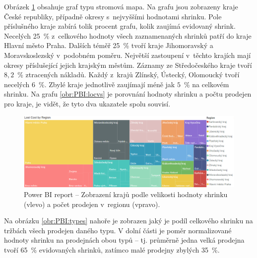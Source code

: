 Obrázek \ref*{obr:PBI:loc} obsahuje graf typu stromová mapa. Na grafu jsou zobrazeny kraje České republiky, případně okresy s~nejvyššími hodnotami shrinku. Pole příslušného kraje zabírá tolik procent grafu, kolik zaujímá evidovaný shrink. Necelých 25~\% z~celkového hodnoty všech zaznamenaných shrinků patří do kraje Hlavní město Praha. Dalších téměř 25~\% tvoří kraje Jihomoravský a Moravskoslezský v~podobném poměru. Největší zastoupení v~těchto krajích mají okresy příslušející jejich krajským městům. Záznamy ze Středočeského kraje tvoří $8{,}2$~\% ztracených nákladů. Každý z~krajů Zlínský, Ústecký, Olomoucký tvoří necelých $6$~\%. Zbylé kraje jednotlivě zaujímají méně jak $5$~\% na celkovém shrinku. Na grafu \ref*{obr:PBI:locvs} je porovnání hodnoty shrinku a počtu prodejen pro kraje, je vidět, že tyto dva ukazatele spolu souvisí.
\begin{figure}[h!]
    \centering
    \captionsetup{justification=centering}
    \includegraphics[width=\textwidth]{obrazky/PBI/location.png}
    \caption{Power BI report -- Zobrazení krajů podle velikosti hodnoty shrinku (vlevo) a počet prodejen v~regionu (vpravo).}
    \label{obr:PBI:loc}
\end{figure}

Na obrázku \ref*{obr:PBI:types} nahoře je zobrazen jaký je podíl celkového shrinku na tržbách všech prodejen daného typu. V dolní části je poměr normalizované hodnoty shrinku na prodejnách obou typů -- tj. průměrně jedna velká prodejna  tvoří 65~\% evidovaných shrinků, zatímco malé prodejny zbylých 35~\%.

